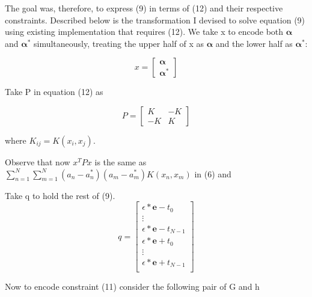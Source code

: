 \documentclass[12pt]{article}
\begin{document}
The goal was, therefore, to express (9) in terms of (12) and their respective constraints.
Described below is the transformation I devised to solve equation (9) using existing implementation that requires (12).
We take x to encode both \(\bm{\alpha}\) and \(\bm{\alpha^*}\) simultaneously, treating the upper half of x as 
\(\bm{\alpha}\) and the lower half 
as \(\bm{\alpha^*}\):


\[x =
  \begin{bmatrix}
    \bm{ \alpha} \\
    \bm{ \alpha^*}
  \end{bmatrix}
\]

Take P in equation (12) as 

\[P =
\begin{bmatrix}
       K & -K           \\
       -K & K            
     \end{bmatrix}
\]

where \(K_{ij} = K(x_i,x_j)\).

Observe that now \(x^T P x\) is the same as 
\(\sum_{n=1}^{N}\sum_{m=1}^{N}(a_n-a_n^*)(a_m-a_m^*)K(x_n,x_m)\) in (6) and 

Take q to hold the rest of (9).
\[q =
\begin{bmatrix}
  \epsilon*\mathbf{e}-t_0           \\
  \vdots                                     \\
  \epsilon*\mathbf{e}-t_{N-1}           \\
   \epsilon*\mathbf{e}+t_0           \\
   \vdots                           \\
  \epsilon*\mathbf{e}+t_{N-1}           \\
     \end{bmatrix}
\]

Now to encode constraint (11) consider the following pair of G and h
\end{document}

